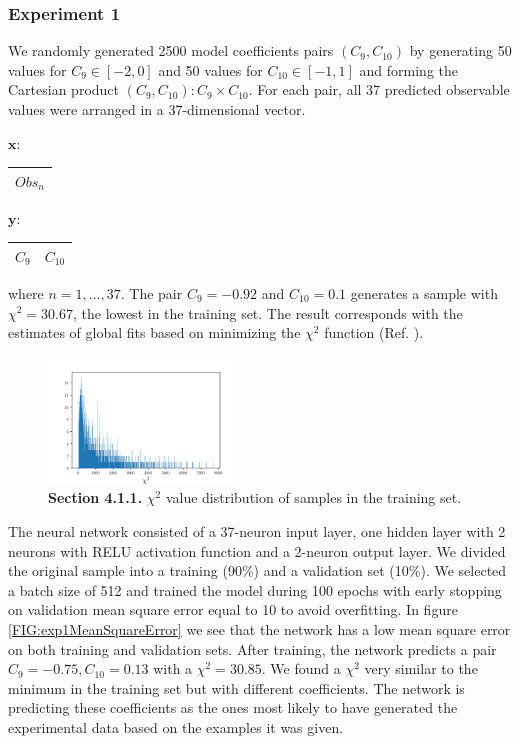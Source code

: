 \documentclass[a4paper,fleqn]{cas-dc}
\begin{document}
\subsubsection{Experiment 1}
We randomly generated 2500 model coefficients pairs \( (C_9, C_{10})\) by generating 50 values for  \(C_9 \in [-2, 0] \) and 50 values for \(C_{10} \in [-1, 1] \) and forming the Cartesian product \((C_9, C_{10}):C_9 \times C_{10} \). For each pair, all 37 predicted observable values were arranged in a 37-dimensional vector.
\begin{center}
	\(\boldsymbol{x:} \)
	\quad
	\begin{tabular}{ |c|  } 
		\hline
		\(Obs_n\)\\ 
		\hline
	\end{tabular}
\end{center}
\begin{center}
	\(\boldsymbol{y:} \)
	\quad
	\begin{tabular}{ |c|c|  } 
		\hline
		\(C_9\) & \(C_{10}\) \\ 
		
		\hline
	\end{tabular}
\end{center}
where \(n=1,...,37\).
The pair \(C_9 = -0.92\) and \(C_{10} =0.1 \) generates a sample with \(\chi^2 = 30.67 \), the lowest in the training set. The result corresponds with the estimates of global fits based on minimizing the \(\chi^2 \) function (Ref. \cite{Alguer__2019}).
\begin{figure}
	\centering
	\includegraphics[width=0.45\textwidth]{images/histChisquare.pdf}
	\caption{\textbf{Section 4.1.1.} \(\chi^2 \) value distribution of samples in the training set.}
	\label{FIG:histChisquare}
\end{figure}

The neural network consisted of a 37-neuron input layer, one hidden layer with 2 neurons  with RELU activation function and a 2-neuron output layer.  We divided the original sample into a training (90\%) and a validation set (10\%). We selected a batch size of 512 and trained the model during 100 epochs with early stopping on validation mean square error equal to 10 to avoid overfitting. In figure \ref{FIG:exp1MeanSquareError} we see that the network has a low mean square error on both training and validation sets. After training, the network predicts a pair \(C_9 = -0.75, C_{10} = 0.13 \) with a \(\chi^2 = 30.85 \). We found a \(\chi^2 \) very similar to the minimum in the training set but with different coefficients. The network is predicting these coefficients as the ones most likely to have generated the experimental data based on the examples it was given.
\end{document}
